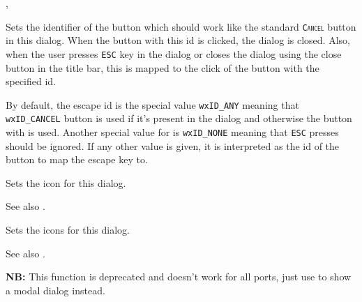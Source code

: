 , 


\label{wxdialogsetescapeid}


Sets the identifier of the button which should work like the standard 
\texttt{\textsc{Cancel}} button in this dialog. When the button with this id is
clicked, the dialog is closed. Also, when the user presses \texttt{\textsc{ESC}} 
key in the dialog or closes the dialog using the close button in the title bar,
this is mapped to the click of the button with the specified id.

By default, the escape id is the special value \texttt{wxID\_ANY} meaning that 
\texttt{wxID\_CANCEL} button is used if it's present in the dialog and
otherwise the button with  
is used. Another special value for  is \texttt{wxID\_NONE} meaning that
\texttt{\textsc{ESC}} presses should be ignored. If any other value is given, it
is interpreted as the id of the button to map the escape key to.


\label{wxdialogseticon}


Sets the icon for this dialog.



See also .


\label{wxdialogseticons}


Sets the icons for this dialog.



See also .


\label{wxdialogsetmodal}


{\bf NB:} This function is deprecated and doesn't work for all ports, just use
 to show a modal dialog instead.

